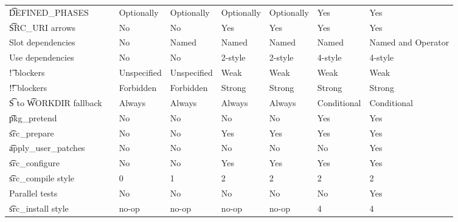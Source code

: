 \begin{landscape}
\begin{longtable}{llP{5em}P{5em}P{6em}P{6em}P{6em}P{6em}}
\t{DEFINED\_PHASES} &  &
    Optionally & Optionally & Optionally & Optionally & Yes & Yes \\

\t{SRC\_URI} arrows &  &
    No & No & Yes & Yes & Yes & Yes \\

Slot dependencies &  &
    No & Named & Named & Named & Named & Named and Operator \\

Use dependencies &  &
    No & No & 2-style & 2-style & 4-style & 4-style \\

\t{!} blockers &  &
    Unspecified & Unspecified & Weak & Weak & Weak & Weak \\

\t{!!} blockers &  &
    Forbidden & Forbidden & Strong & Strong & Strong & Strong \\

\t{S} to \t{WORKDIR} fallback &  &
    Always & Always & Always & Always & Conditional & Conditional \\

\t{pkg\_pretend} &  &
    No & No & No & No & Yes & Yes \\

\t{src\_prepare} &  &
    No & No & Yes & Yes & Yes & Yes \\

\t{apply\_user\_patches} &  &
    No & No & No & No & No & Yes \\

\t{src\_configure} &  &
    No & No & Yes & Yes & Yes & Yes \\

\t{src\_compile} style &  &
    0 & 1 & 2 & 2 & 2 & 2 \\

Parallel tests &  &
    No & No & No & No & No & Yes \\

\t{src\_install} style &  &
    no-op & no-op & no-op & no-op & 4 & 4 \\


\end{longtable}
\end{landscape}
